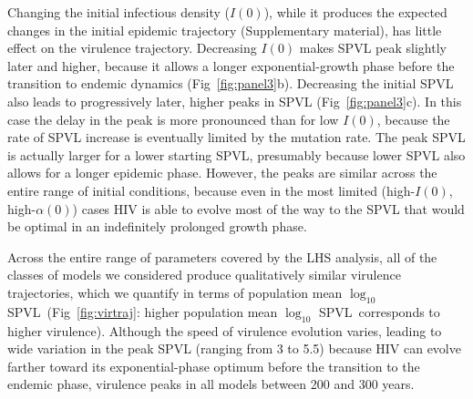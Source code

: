 \documentclass[10pt,letterpaper]{article}
\renewcommand{\figurename}{Fig}
\newcommand{\Lspvl}{$\log_{10}$ SPVL}
\begin{document}
Changing the initial infectious density ($I(0)$), while it produces the expected changes in the initial epidemic trajectory (Supplementary material), has little effect on the virulence trajectory. Decreasing $I(0)$ makes SPVL peak slightly later and higher, because it allows a longer exponential-growth phase before the transition to endemic dynamics (\figurename~\ref{fig:panel3}b). Decreasing the initial SPVL also leads to progressively later, higher peaks in SPVL (\figurename~\ref{fig:panel3}c). In this case the delay in the peak is more pronounced than for low $I(0)$, because the rate of SPVL increase is eventually limited by the mutation rate. The peak SPVL is actually larger for a lower starting SPVL, presumably because lower SPVL also allows for a longer epidemic phase. However, the peaks are similar across the entire range of initial conditions, because even in the most limited (high-$I(0)$, high-$\alpha(0)$) cases HIV is able to evolve most of the way to the SPVL that would be optimal in an indefinitely prolonged growth phase.

Across the entire range of parameters covered by the LHS analysis, all
of the classes of models we considered produce qualitatively similar
virulence trajectories, which we quantify in terms of population mean
\Lspvl\ (\figurename~\ref{fig:virtraj}: higher population mean
\Lspvl\ corresponds to higher virulence). Although the speed of
virulence evolution varies, leading to wide variation in the peak SPVL
(ranging from 3 to 5.5) because HIV can evolve farther toward
its exponential-phase optimum before the transition to the
endemic phase, virulence peaks in all models between 200 and
300 years.
\end{document}
